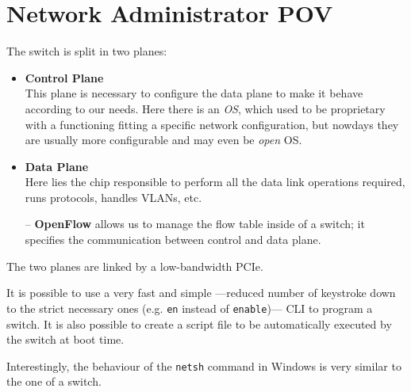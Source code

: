 \section{Network Administrator POV}
The switch is split in two planes:
\begin{itemize}
   \item \textbf{Control Plane}\\
   This plane is necessary to configure the data plane to make it behave according to our needs.
   Here there is an \textit{OS}, which used to be proprietary with a functioning fitting a specific network configuration, but nowdays they are usually more configurable and may even be \textit{open} OS.
   
   \item \textbf{Data Plane}\\
   Here lies the chip responsible to perform all the data link operations required, runs protocols, handles VLANs, etc.

   \item[--] \textbf{OpenFlow} allows us to manage the flow table inside of a switch; it specifies the communication between control and data plane.
\end{itemize}

The two planes are linked by a low-bandwidth PCIe.


It is possible to use a very fast and simple ---reduced number of keystroke down to the strict necessary ones (e.g. \texttt{en} instead of \texttt{enable})--- CLI to program a switch. It is also possible to create a script file to be automatically executed by the switch at boot time.{\ns
{}}

Interestingly, the behaviour of the \texttt{netsh} command in Windows is very similar to the one of a switch.
